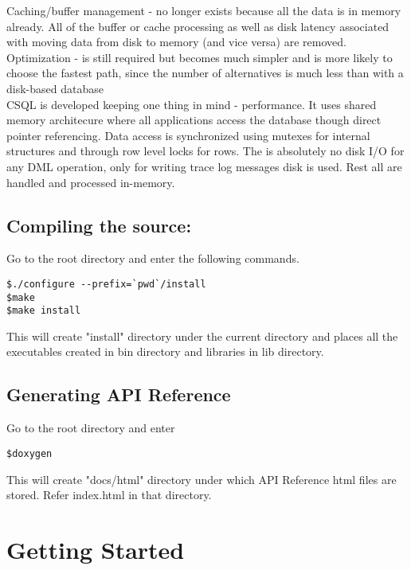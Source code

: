 \documentclass[12pt]{article}
\begin{document}
    Caching/buffer management - no longer exists because all the data is in memory already. All of the buffer or cache
               processing as well as disk latency associated with moving data from disk to 
               memory (and vice versa) are removed. \\

    Optimization - is still required but becomes much simpler and is more likely to choose the fastest path, 
               since the number of alternatives is much less than with a disk-based database \\

CSQL is developed keeping one thing in mind - performance. It uses shared memory architecure where all
applications access the database though direct pointer referencing. Data access is synchronized using mutexes
 for internal structures and through row level locks for rows. The is absolutely no disk I/O for any DML operation,
only for writing trace log messages disk is used. Rest all are handled and processed in-memory. \\

\subsection{Compiling the source:}
\label{compsrc}
Go to the root directory and enter the following commands. 
\begin{verbatim}
$./configure --prefix=`pwd`/install
$make
$make install
\end{verbatim}

This will create "install" directory under the current directory and places all the executables created in bin directory and libraries in lib directory. \\

\subsection{Generating API Reference}
\label{genAPIref}
Go to the root directory and enter
\begin{verbatim}
$doxygen
\end{verbatim}

This will create "docs/html" directory under which API Reference html files are stored. Refer index.html in that directory.

\section{Getting Started}
\label{getstarted}
\end{document}
